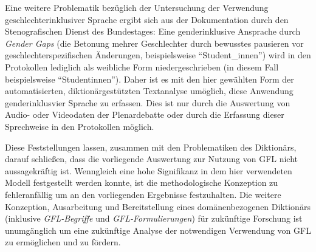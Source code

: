 \documentclass[12pt, 
    twoside=false, 
    bibliography=totoc, 
    numbers=endperiod, 
    headings=normal, 
    toc=chapterentrydotfill
    ]{scrbook}
\begin{document}
Eine weitere Problematik bezüglich der Untersuchung der Verwendung geschlechterinklusiver Sprache ergibt sich aus der Dokumentation durch den Stenografischen Dienst des Bundestages: Eine genderinklusive Ansprache durch \emph{Gender Gaps} (die Betonung mehrer Geschlechter durch bewusstes pausieren vor geschlechterspezifischen Änderungen, beispielsweise \enquote{Student\_innen}) wird in den Protokollen lediglich als weibliche Form niedergeschrieben (in diesem Fall beispielsweise \enquote{Studentinnen}). Daher ist es mit den hier gewählten Form der automatisierten, diktionärgestützten Textanalyse umöglich, diese Anwendung genderinklusvier Sprache zu erfassen.
Dies ist nur durch die Auswertung von Audio- oder Videodaten der Plenardebatte oder durch die Erfassung dieser Sprechweise in den Protokollen möglich.

Diese Feststellungen lassen, zusammen mit den Problematiken des Diktionärs, darauf schließen, dass die vorliegende Auswertung zur Nutzung von GFL nicht aussagekräftig ist. Wenngleich eine hohe Signifikanz in dem hier verwendeten Modell festgestellt werden konnte, ist die methodologische Konzeption zu fehleranfällig um an den vorliegenden Ergebnisse festzuhalten. Die weitere Konzeption, Ausarbeitung und Bereitstellung eines domänenbezogenen Diktionärs (inklusive \emph{GFL-Begriffe} und \emph{GFL-Formulierungen}) für zukünftige Forschung ist unumgänglich um eine zukünftige Analyse der notwendigen Verwendung von GFL zu ermöglichen und zu fördern.


\end{document}
